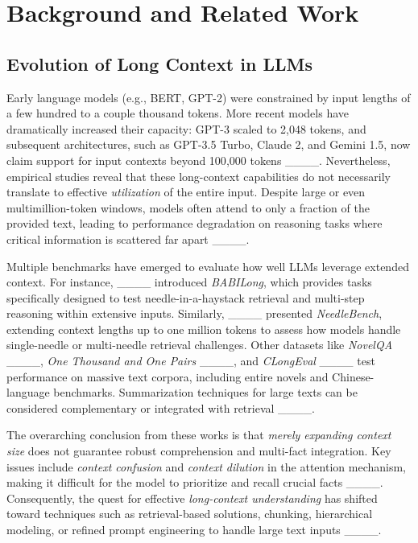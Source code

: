 \section{Background and Related Work}
\label{sec:background}

\subsection{Evolution of Long Context in LLMs}
Early language models (e.g., BERT, GPT-2) were constrained by input lengths of a few hundred to a couple thousand tokens. More recent models have dramatically increased their capacity: GPT-3 scaled to 2{,}048 tokens, and subsequent architectures, such as GPT-3.5 Turbo, Claude 2, and Gemini 1.5, now claim support for input contexts beyond 100{,}000 tokens ____. Nevertheless, empirical studies reveal that these long-context capabilities do not necessarily translate to effective \emph{utilization} of the entire input. Despite large or even multimillion-token windows, models often attend to only a fraction of the provided text, leading to performance degradation on reasoning tasks where critical information is scattered far apart ____.

Multiple benchmarks have emerged to evaluate how well LLMs leverage extended context. For instance, ____ introduced \emph{BABILong}, which provides tasks specifically designed to test needle-in-a-haystack retrieval and multi-step reasoning within extensive inputs. Similarly, ____ presented \emph{NeedleBench}, extending context lengths up to one million tokens to assess how models handle single-needle or multi-needle retrieval challenges. Other datasets like \emph{NovelQA} ____, \emph{One Thousand and One Pairs} ____, and \emph{CLongEval} ____ test performance on massive text corpora, including entire novels and Chinese-language benchmarks. Summarization techniques for large texts can be considered complementary or integrated with retrieval ____.

The overarching conclusion from these works is that \emph{merely expanding context size} does not guarantee robust comprehension and multi-fact integration. Key issues include \emph{context confusion} and \emph{context dilution} in the attention mechanism, making it difficult for the model to prioritize and recall crucial facts ____. Consequently, the quest for effective \emph{long-context understanding} has shifted toward techniques such as retrieval-based solutions, chunking, hierarchical modeling, or refined prompt engineering to handle large text inputs ____.

